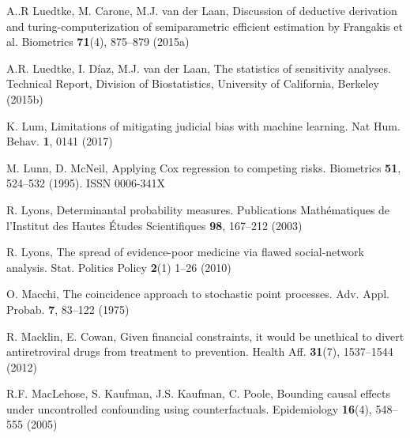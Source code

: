 \begin{list}{}{\setlength{\leftmargin}{2.1em}\setlength{\labelwidth}{0pt}
  \setlength{\labelsep}{0pt}\setlength{\itemindent}{-2.1em}
  \setlength{\parsep}{0pt}\setlength{\itemsep}{2pt}\setlength{\topsep}{0pt}}
\item\label{refentry:REF212}A..R Luedtke, M. Carone, M.J. van der Laan, Discussion of deductive derivation and turing-computerization of semiparametric efficient estimation by Frangakis et al. Biometrics \textbf{71}(4), 875--879 (2015a)\label{refend:REF212}
\item\label{refentry:REF213}A.R. Luedtke, I. Díaz, M.J. van der Laan, The statistics of sensitivity analyses. Technical Report, Division of Biostatistics, University of California, Berkeley (2015b)\label{refend:REF213}
\item\label{refentry:REF214}K. Lum, Limitations of mitigating judicial bias with machine learning. Nat Hum. Behav. \textbf{1}, 0141 (2017)\label{refend:REF214}
\item\label{refentry:REF215}M. Lunn, D. McNeil, Applying Cox regression to competing risks. Biometrics \textbf{51}, 524--532 (1995). ISSN 0006-341X\label{refend:REF215}
\item\label{refentry:REF216}R. Lyons, Determinantal probability measures. Publications Mathématiques de l'Institut des Hautes Études Scientifiques \textbf{98}, 167--212 (2003)\label{refend:REF216}
\item\label{refentry:REF217}R. Lyons, The spread of evidence-poor medicine via flawed social-network analysis. Stat. Politics Policy \textbf{2}(1) 1--26 (2010)\label{refend:REF217}
\item\label{refentry:REF218}O. Macchi, The coincidence approach to stochastic point processes. Adv. Appl. Probab. \textbf{7}, 83--122 (1975)\label{refend:REF218}
\item\label{refentry:REF219}R. Macklin, E. Cowan, Given financial constraints, it would be unethical to divert antiretroviral drugs from treatment to prevention. Health Aff. \textbf{31}(7), 1537--1544 (2012)\label{refend:REF219}
\item\label{refentry:REF220}R.F. MacLehose, S. Kaufman, J.S. Kaufman, C. Poole, Bounding causal effects under uncontrolled confounding using counterfactuals. Epidemiology \textbf{16}(4), 548--555 (2005)\label{refend:REF220}

\end{list}
